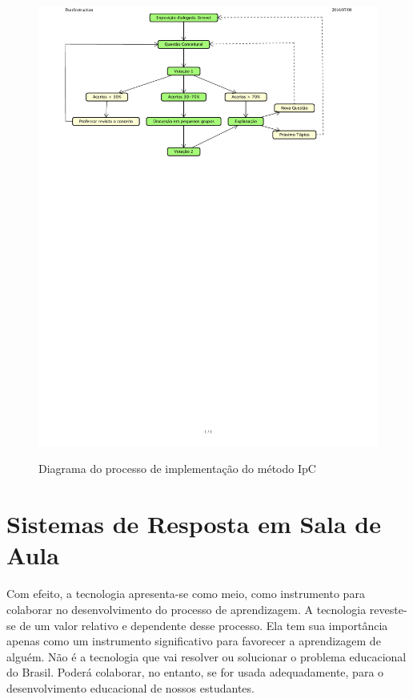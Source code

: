 \begin{figure}[htbp]
  \centering
  \caption{Diagrama do processo de implementação do método IpC}
  \includegraphics[clip, trim=0cm 18cm 3cm .4cm,scale=0.75]{imagens/peer_instruction}
  \label{fig:desen_fluxograma_ipc}
\end{figure}


\section{Sistemas de Resposta em Sala de Aula}
\label{section:sistemas_de_resposta}

Com efeito, a tecnologia apresenta-se como meio, como instrumento para colaborar no desenvolvimento do processo de aprendizagem. A tecnologia reveste-se de um valor relativo e dependente desse processo. Ela tem sua importância apenas como um instrumento significativo para favorecer a aprendizagem de alguém. Não é a tecnologia que vai resolver ou solucionar o problema educacional do Brasil. Poderá colaborar, no entanto, se for usada adequadamente, para o desenvolvimento educacional de nossos estudantes.


